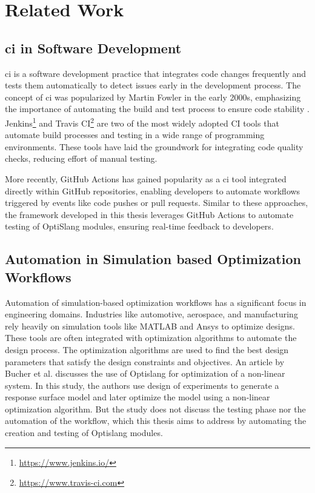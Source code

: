 \chapter{Related Work}
\section{\acrlong{ci} in Software Development}
\acrfull{ci} is a software development practice that integrates code changes frequently and tests them automatically to detect issues early in the development 
process. The concept of \acrshort{ci} was popularized by Martin Fowler in the early 2000s, emphasizing the importance of automating the build and test 
process to ensure code stability\cite{fowler2006continuous} . Jenkins\footnote{\url{https://www.jenkins.io/}} and Travis CI\footnote{\url{https://www.travis-ci.com}} 
are two of the most widely adopted CI tools that automate build processes and testing in a wide range of programming environments. These tools have laid the 
groundwork for integrating code quality checks, reducing effort of manual testing.

More recently, GitHub Actions\cite{github_actions} has gained popularity as a \acrshort{ci} tool integrated directly within GitHub repositories, enabling developers to automate 
workflows triggered by events like code pushes or pull requests. Similar to these approaches, the framework developed in this thesis leverages GitHub Actions 
to automate testing of OptiSlang modules, ensuring real-time feedback to developers\cite{8444829}.

\section{Automation in Simulation based Optimization Workflows}
Automation of simulation-based optimization workflows has a significant focus in engineering domains. Industries like automotive, aerospace, and manufacturing
rely heavily on simulation tools like MATLAB and Ansys to optimize designs. These tools are often integrated with optimization algorithms to automate the 
design process. The optimization algorithms are used to find the best design parameters that satisfy the design constraints and objectives. An article by
Bucher et al.\cite{non_linear_optimization} discusses the use of Optislang for optimization of a non-linear system. In this study, the authors use design of 
experiments to generate a response surface model and later optimize the model using a non-linear optimization algorithm. But the study does not discuss 
the testing phase nor the automation of the workflow, which this thesis aims to address by automating the creation and testing of Optislang modules.

